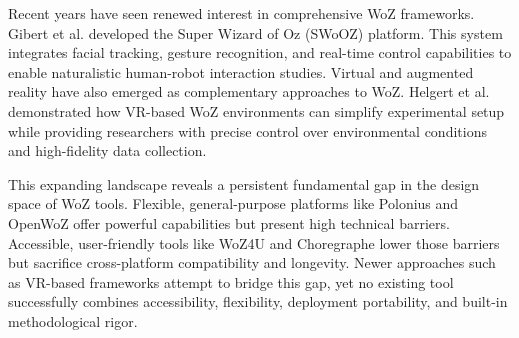 Recent years have seen renewed interest in comprehensive WoZ frameworks. Gibert et al. \cite{Gibert2013} developed the Super Wizard of Oz (SWoOZ) platform. This system integrates facial tracking, gesture recognition, and real-time control capabilities to enable naturalistic human-robot interaction studies. Virtual and augmented reality have also emerged as complementary approaches to WoZ. Helgert et al. \cite{Helgert2024} demonstrated how VR-based WoZ environments can simplify experimental setup while providing researchers with precise control over environmental conditions and high-fidelity data collection.

This expanding landscape reveals a persistent fundamental gap in the design space of WoZ tools. Flexible, general-purpose platforms like Polonius and OpenWoZ offer powerful capabilities but present high technical barriers. Accessible, user-friendly tools like WoZ4U and Choregraphe lower those barriers but sacrifice cross-platform compatibility and longevity. Newer approaches such as VR-based frameworks attempt to bridge this gap, yet no existing tool successfully combines accessibility, flexibility, deployment portability, and built-in methodological rigor. 

